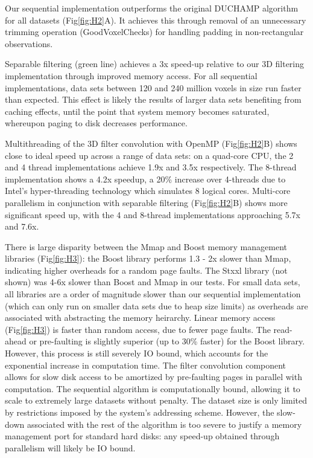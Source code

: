 Our sequential implementation outperforms the original DUCHAMP algorithm for all datasets (Fig\ref{fig:H2}A).  It achieves this through removal of an unnecessary  trimming operation (GoodVoxelChecks) for handling padding in non-rectangular observations.  

Separable filtering (green line) achieves a 3x speed-up relative to our 3D filtering implementation  through improved memory access. 
For all sequential implementations, data sets between  120 and 240 million voxels in size run faster than expected. This effect is likely the results of
larger data sets benefiting from caching effects, until  the point that system memory becomes saturated, whereupon paging to disk decreases performance.

Multithreading  of the 3D filter convolution  with OpenMP (Fig\ref{fig:H2}B) shows close to ideal speed up across a range of data sets:
on a quad-core CPU, the 2 and 4 thread implementations achieve 1.9x and 3.5x respectively.  The 8-thread implementation shows a 4.2x speedup, a 20\% increase over 4-threads due to  Intel's hyper-threading technology which simulates 8 logical cores. 
Multi-core parallelism in conjunction with separable filtering (Fig\ref{fig:H2}B) shows more significant speed up, with the 4 and 8-thread implementations approaching 5.7x and 7.6x. 

There is large disparity between the Mmap and Boost memory management libraries (Fig\ref{fig:H3}): the Boost library performs  1.3 - 2x slower than Mmap, indicating higher overheads for a random page faults.   The Stxxl library (not shown) was 4-6x slower than Boost and Mmap in our tests.
For small data sets, all libraries are a order of magnitude slower than our sequential implementation (which can only run on smaller data sets due to heap size limits) as overheads are associated with
abstracting the memory heirarchy.
Linear memory access (Fig\ref{fig:H3}) is faster than random access, due to fewer page faults. The read-ahead or pre-faulting is slightly superior (up to 30\% faster) for the Boost library. However, this process is still severely IO bound,  which accounts for the exponential increase in computation time.
The filter convolution component allows for slow disk access to be amortized by pre-faulting pages in parallel with computation. 
The sequential algorithm is  computationally bound, allowing it to scale to extremely large datasets without penalty. The dataset size is only limited by restrictions imposed by the system's addressing scheme. 
However, the slow-down associated with the rest of the algorithm is too severe to justify a memory management port for standard hard disks:
any speed-up obtained through parallelism will likely be IO bound.

